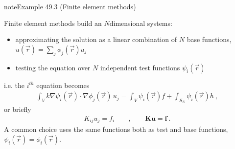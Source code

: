\documentclass[letterpaper,10pt,english]{jupyterBook}
\begin{document}
\begin{sphinxadmonition}{note}{Example 49.3 (Finite element methods)}



\sphinxAtStartPar
Finite element methods build an \(N\)\sphinxhyphen{}dimensional systems:
\begin{itemize}
\item {} 
\sphinxAtStartPar
approximating the solution as a linear combination of \(N\) base functions, \(u(\vec{r}) = \sum_j \phi_j(\vec{r}) u_j\)

\item {} 
\sphinxAtStartPar
testing the equation over \(N\) independent test functions \(\psi_i(\vec{r})\)

\end{itemize}

\sphinxAtStartPar
i.e. the \(i^{th}\) equation becomes
\begin{equation*}
\begin{split}\int_{V} k \nabla \psi_i(\vec{r}) \cdot \nabla \phi_j(\vec{r}) \, u_j = \int_{V} \psi_i(\vec{r}) f + \int_{S_N} \psi_i(\vec{r}) h \ ,\end{split}
\end{equation*}
\sphinxAtStartPar
or briefly
\begin{equation*}
\begin{split}K_{ij} u_j = f_i \qquad , \qquad \mathbf{K} \mathbf{u} = \mathbf{f} \ .\end{split}
\end{equation*}
\sphinxAtStartPar
A common choice uses the same functions both as test and base functions, \(\psi_i(\vec{r}) = \phi_i(\vec{r})\).
\end{sphinxadmonition}
\end{document}
